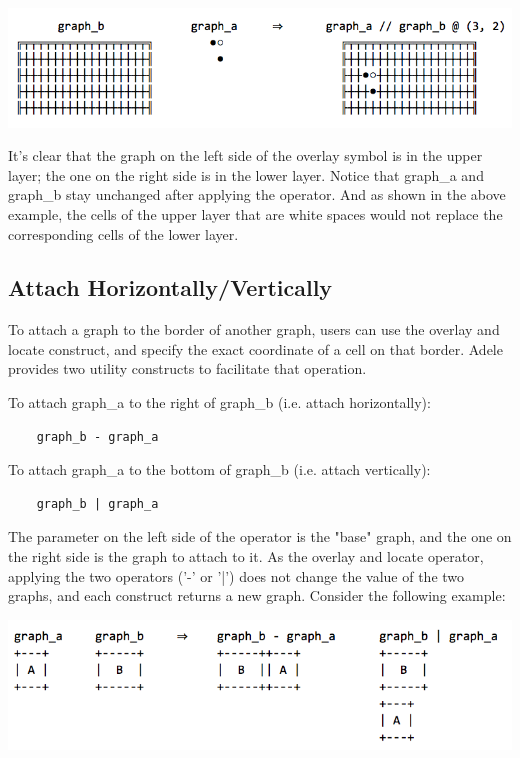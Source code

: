 \documentclass[11pt,letterpaper]{article}
\begin{document}
\includegraphics[width=\textwidth]{./graph_01.png}

It's clear that the graph on the left side of the overlay symbol is in the upper layer; the one on the right side is in the lower layer. Notice that graph\_a and graph\_b stay unchanged after applying the operator. And as shown in the above example, the cells of the upper layer that are white spaces would not replace the corresponding cells of the lower layer.

\subsection {Attach Horizontally/Vertically}

To attach a graph to the border of another graph, users can use the overlay and locate construct, and specify the exact coordinate of a cell on that border. Adele provides two utility constructs to facilitate that operation.

To attach graph\_a to the right of graph\_b (i.e. attach horizontally):
\begin{lstlisting}
    graph_b - graph_a
\end{lstlisting}

To attach graph\_a to the bottom of graph\_b (i.e. attach vertically):
\begin{lstlisting}
    graph_b | graph_a
\end{lstlisting}

The parameter on the left side of the operator is the "base" graph, and the one on the right side is the graph to attach to it. As the overlay and locate operator, applying the two operators ('-' or '|') does not change the value of the two graphs, and each construct returns a new graph. Consider the following example:

\includegraphics[width=\textwidth]{./graph_02.png}
\end{document}

